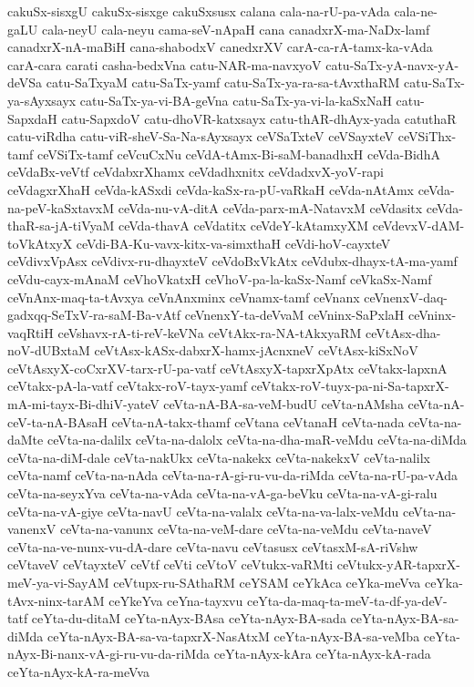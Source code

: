 {cakuSx-sisxgU
cakuSx-sisxge
cakuSxsusx
calana
cala-na-rU-pa-vAda
cala-ne-gaLU
cala-neyU
cala-neyu
cama-seV-nApaH
cana
canadxrX-ma-NaDx-lamf
canadxrX-nA-maBiH
cana-shabodxV
canedxrXV
carA-ca-rA-tamx-ka-vAda
carA-cara
carati
casha-bedxVna
catu-NAR-ma-navxyoV
catu-SaTx-yA-navx-yA-deVSa
catu-SaTxyaM
catu-SaTx-yamf
catu-SaTx-ya-ra-sa-tAvxthaRM
catu-SaTx-ya-sAyxsayx
catu-SaTx-ya-vi-BA-geVna
catu-SaTx-ya-vi-la-kaSxNaH
catu-SapxdaH
catu-SapxdoV
catu-dhoVR-katxsayx
catu-thAR-dhAyx-yada
catuthaR
catu-viRdha
catu-viR-sheV-Sa-Na-sAyxsayx
ceVSaTxteV
ceVSayxteV
ceVSiThx-tamf
ceVSiTx-tamf
ceVcuCxNu
ceVdA-tAmx-Bi-saM-banadhxH
ceVda-BidhA
ceVdaBx-veVtf
ceVdabxrXhamx
ceVdadhxnitx
ceVdadxvX-yoV-rapi
ceVdagxrXhaH
ceVda-kASxdi
ceVda-kaSx-ra-pU-vaRkaH
ceVda-nAtAmx
ceVda-na-peV-kaSxtavxM
ceVda-nu-vA-ditA
ceVda-parx-mA-NatavxM
ceVdasitx
ceVda-thaR-sa-jA-tiVyaM
ceVda-thavA
ceVdatitx
ceVdeY-kAtamxyXM
ceVdevxV-dAM-toVkAtxyX
ceVdi-BA-Ku-vavx-kitx-va-simxthaH
ceVdi-hoV-cayxteV
ceVdivxVpAsx
ceVdivx-ru-dhayxteV
ceVdoBxVkAtx
ceVdubx-dhayx-tA-ma-yamf
ceVdu-cayx-mAnaM
ceVhoVkatxH
ceVhoV-pa-la-kaSx-Namf
ceVkaSx-Namf
ceVnAnx-maq-ta-tAvxya
ceVnAnxminx
ceVnamx-tamf
ceVnanx
ceVnenxV-daq-gadxqq-SeTxV-ra-saM-Ba-vAtf
ceVnenxY-ta-deVvaM
ceVninx-SaPxlaH
ceVninx-vaqRtiH
ceVshavx-rA-ti-reV-keVNa
ceVtAkx-ra-NA-tAkxyaRM
ceVtAsx-dha-noV-dUBxtaM
ceVtAsx-kASx-dabxrX-hamx-jAcnxneV
ceVtAsx-kiSxNoV
ceVtAsxyX-coCxrXV-tarx-rU-pa-vatf
ceVtAsxyX-tapxrXpAtx
ceVtakx-lapxnA
ceVtakx-pA-la-vatf
ceVtakx-roV-tayx-yamf
ceVtakx-roV-tuyx-pa-ni-Sa-tapxrX-mA-mi-tayx-Bi-dhiV-yateV
ceVta-nA-BA-sa-veM-budU
ceVta-nAMsha
ceVta-nA-ceV-ta-nA-BAsaH
ceVta-nA-takx-thamf
ceVtana
ceVtanaH
ceVta-nada
ceVta-na-daMte
ceVta-na-dalilx
ceVta-na-dalolx
ceVta-na-dha-maR-veMdu
ceVta-na-diMda
ceVta-na-diM-dale
ceVta-nakUkx
ceVta-nakekx
ceVta-nakekxV
ceVta-nalilx
ceVta-namf
ceVta-na-nAda
ceVta-na-rA-gi-ru-vu-da-riMda
ceVta-na-rU-pa-vAda
ceVta-na-seyxYva
ceVta-na-vAda
ceVta-na-vA-ga-beVku
ceVta-na-vA-gi-ralu
ceVta-na-vA-giye
ceVta-navU
ceVta-na-valalx
ceVta-na-va-lalx-veMdu
ceVta-na-vanenxV
ceVta-na-vanunx
ceVta-na-veM-dare
ceVta-na-veMdu
ceVta-naveV
ceVta-na-ve-nunx-vu-dA-dare
ceVta-navu
ceVtasusx
ceVtasxM-sA-riVshw
ceVtaveV
ceVtayxteV
ceVtf
ceVti
ceVtoV
ceVtukx-vaRMti
ceVtukx-yAR-tapxrX-meV-ya-vi-SayAM
ceVtupx-ru-SAthaRM
ceYSAM
ceYkAca
ceYka-meVva
ceYka-tAvx-ninx-tarAM
ceYkeYva
ceYna-tayxvu
ceYta-da-maq-ta-meV-ta-df-ya-deV-tatf
ceYta-du-ditaM
ceYta-nAyx-BAsa
ceYta-nAyx-BA-sada
ceYta-nAyx-BA-sa-diMda
ceYta-nAyx-BA-sa-va-tapxrX-NasAtxM
ceYta-nAyx-BA-sa-veMba
ceYta-nAyx-Bi-nanx-vA-gi-ru-vu-da-riMda
ceYta-nAyx-kAra
ceYta-nAyx-kA-rada
ceYta-nAyx-kA-ra-meVva
}
